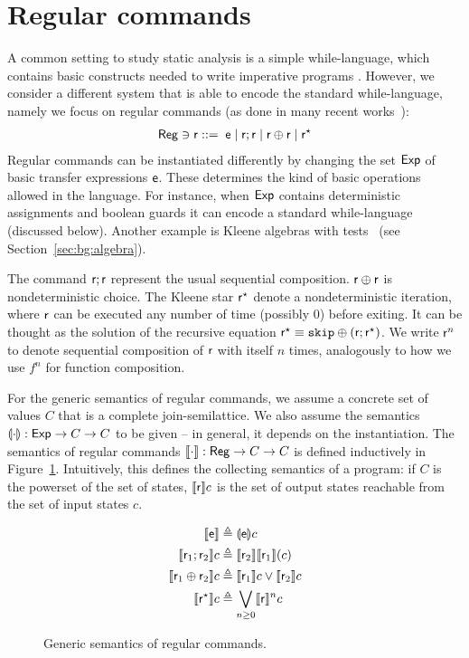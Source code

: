 \section{Regular commands}\label{sec:bg:regcomm}
A common setting to study static analysis is a simple while-language, which contains basic constructs needed to write imperative programs \cite{Winskel93}. However, we consider a different system that is able to encode the standard while-language, namely we focus on regular commands (as done in many recent works~\cite{OHearn20,BGGR21,MOH21,RBDDOV20,ZDS23}):
\begin{align}
	\mathsf{Reg}\ni \mathsf{r} ::= \; \mathsf{e}\mid \mathsf{r};\mathsf{r}\mid \mathsf{r} \oplus \mathsf{r} \mid \mathsf{r}^\star \label{eq:bg:regr-def}
\end{align}
Regular commands can be instantiated differently by changing the set $\mathsf{Exp}$ of basic transfer expressions $\mathsf{e}$. These determines the kind of basic operations allowed in the language. For instance, when $\mathsf{Exp}$ contains deterministic assignments and boolean guards it can encode a standard while-language (discussed below). Another example is Kleene algebras with tests~\cite{Kozen97} (see Section~\ref{sec:bg:algebra}).

The command $\mathsf{r}; \mathsf{r}$ represent the usual sequential composition. $\mathsf{r} \oplus \mathsf{r}$ is nondeterministic choice. The Kleene star $\mathsf{r}^\star$ denote a nondeterministic iteration, where $\mathsf{r}$ can be executed any number of time (possibly 0) before exiting. It can be thought as the solution of the recursive equation $\mathsf{r}^\star \equiv \texttt{skip} \oplus (\mathsf{r}; \mathsf{r}^{\star})$.
We write $\mathsf{r}^n$ to denote sequential composition of $\mathsf{r}$ with itself $n$ times, analogously to how we use $f^n$ for function composition.

For the generic semantics of regular commands, we assume a concrete set of values $C$ that is a complete join-semilattice. We also assume the semantics $\llparenthesis\cdot\rrparenthesis : \mathsf{Exp} \rightarrow C \rightarrow C$ to be given -- in general, it depends on the instantiation.
The semantics of regular commands $\llbracket\cdot\rrbracket : \mathsf{Reg} \rightarrow C \rightarrow C$ is defined inductively in Figure~\ref{fig:bg:regcom-sem}. Intuitively, this defines the collecting semantics of a program: if $C$ is the powerset of the set of states, $\llbracket\mathsf{r}\rrbracket c$ is the set of output states reachable from the set of input states $c$.
\begin{figure}[t]
	\begin{align*}
		\llbracket\mathsf{e}\rrbracket                      & \triangleq \llparenthesis\mathsf{e}\rrparenthesis c                       \\
		\llbracket\mathsf{r}_1 ; \mathsf{r}_2 \rrbracket c       & \triangleq \llbracket\mathsf{r}_2\rrbracket\llbracket\mathsf{r}_1\rrbracket (c)     \\
		\llbracket\mathsf{r}_1 \oplus \mathsf{r}_2\rrbracket c & \triangleq \llbracket\mathsf{r}_1\rrbracket c \vee \llbracket\mathsf{r}_2\rrbracket c \\
		\llbracket\mathsf{r}^\star\rrbracket c              & \triangleq \bigvee_{n \ge 0} \llbracket\mathsf{r}\rrbracket^n c
	\end{align*}
	\caption{Generic semantics of regular commands.}
	\label{fig:bg:regcom-sem}
\end{figure}


